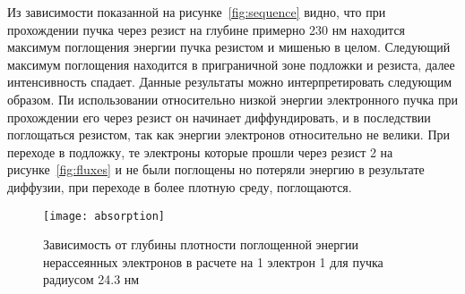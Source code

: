 Из зависимости показанной на рисунке~\ref{fig:sequence} видно, что при прохождении пучка через резист на глубине примерно 230 нм находится максимум поглощения энергии пучка резистом и мишенью в целом. Следующий максимум поглощения находится в приграничной зоне подложки и резиста, далее интенсивность спадает. Данные результаты можно интерпретировать следующим образом. Пи использовании относительно низкой энергии электронного пучка при прохождении его через резист он начинает диффундировать, и в последствии поглощаться резистом, так как энергии электронов относительно не велики. При переходе в подложку, те электроны которые прошли через резист 2 на рисунке~\ref{fig:fluxes} и не были поглощены но потеряли энергию в результате диффузии, при переходе в более плотную среду, поглощаются.
\begin{figure}[h]
    \center
    \texttt{[image: absorption]}
    \caption{Зависимость от глубины плотности поглощенной энергии нерассеянных электронов в расчете на 1 электрон 1 для пучка радиусом 24.3 нм}
    \label{fig:absorption}
\end{figure}

\pagebreak
